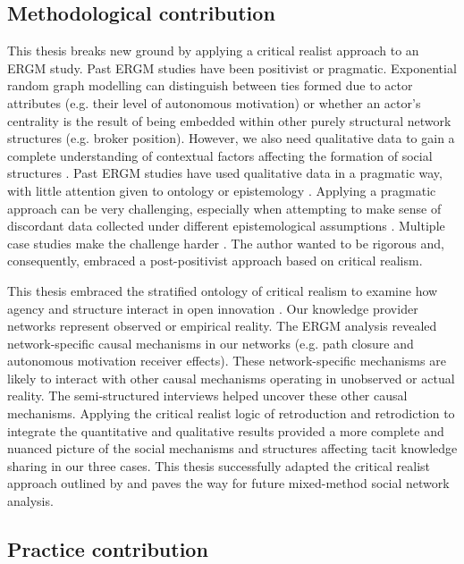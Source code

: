 \subsection{Methodological contribution}

This thesis breaks new ground by applying a critical realist approach to an ERGM study. Past ERGM studies have been positivist or pragmatic. Exponential random graph modelling can distinguish between ties formed due to actor attributes (e.g. their level of autonomous motivation) or whether an actor's centrality is the result of being embedded within other purely structural network structures (e.g. broker position). However, we also need qualitative data to gain a complete understanding of contextual factors affecting the formation of social structures \citep{welch2011theorising,bellotti2014qualitative}. Past ERGM studies have used qualitative data in a pragmatic way, with little attention given to ontology or epistemology \citep[e.g.][]{lomi2013focused,lusher2014cooperative}. Applying a pragmatic approach can be very challenging, especially when attempting to make sense of discordant data collected under different epistemological assumptions \citep{johnson2004mixed, giddings2006mixed, shannon2016making}. Multiple case studies make the challenge harder \citep{welch2011theorising}. The author wanted to be rigorous and, consequently, embraced a post-positivist approach based on critical realism. \medskip

This thesis embraced the stratified ontology of critical realism to examine how agency and structure interact in open innovation \citep{bhaskar2013realist}. Our knowledge provider networks represent observed or empirical reality. The ERGM analysis revealed network-specific causal mechanisms in our networks (e.g. path closure and autonomous motivation receiver effects). These network-specific mechanisms are likely to interact with other causal mechanisms operating in unobserved or actual reality. The semi-structured interviews helped uncover these other causal mechanisms. Applying the critical realist logic of retroduction and retrodiction to integrate the quantitative and qualitative results provided a more complete and nuanced picture of the social mechanisms and structures affecting tacit knowledge sharing in our three cases. This thesis successfully adapted the critical realist approach outlined by \citet{mcavoy2018critical} and paves the way for future mixed-method social network analysis.

\subsection{Practice contribution}

